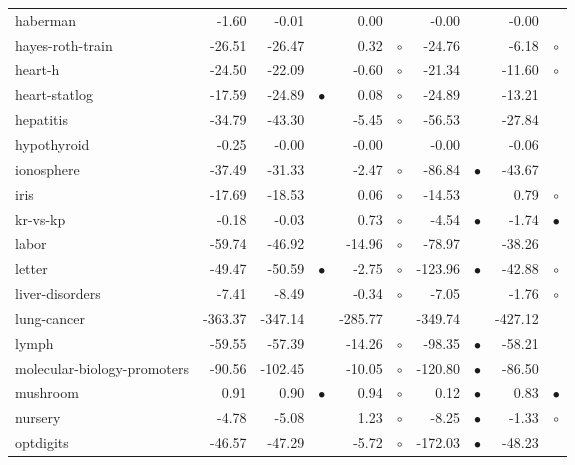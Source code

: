 \begin{table}[thb]
{\begin{tabular}{lrr@{\hspace{0.1cm}}cr@{\hspace{0.1cm}}cr@{\hspace{0.1cm}}cr@{\hspace{0.1cm}}c}
haberman &   -1.60 &   -0.01 &           &    0.00 &          &   -0.00 &           &   -0.00 &          \\
hayes-roth-train &  -26.51 &  -26.47 &           &    0.32 &  $\circ$ &  -24.76 &           &   -6.18 &   $\circ$\\
heart-h &  -24.50 &  -22.09 &           &   -0.60 &  $\circ$ &  -21.34 &           &  -11.60 &   $\circ$\\
heart-statlog &  -17.59 &  -24.89 & $\bullet$ &    0.08 &  $\circ$ &  -24.89 &           &  -13.21 &          \\
hepatitis &  -34.79 &  -43.30 &           &   -5.45 &  $\circ$ &  -56.53 &           &  -27.84 &          \\
hypothyroid &   -0.25 &   -0.00 &           &   -0.00 &          &   -0.00 &           &   -0.06 &          \\
ionosphere &  -37.49 &  -31.33 &           &   -2.47 &  $\circ$ &  -86.84 & $\bullet$ &  -43.67 &          \\
iris &  -17.69 &  -18.53 &           &    0.06 &  $\circ$ &  -14.53 &           &    0.79 &   $\circ$\\
kr-vs-kp &   -0.18 &   -0.03 &           &    0.73 &  $\circ$ &   -4.54 & $\bullet$ &   -1.74 & $\bullet$\\
labor &  -59.74 &  -46.92 &           &  -14.96 &  $\circ$ &  -78.97 &           &  -38.26 &          \\
letter &  -49.47 &  -50.59 & $\bullet$ &   -2.75 &  $\circ$ & -123.96 & $\bullet$ &  -42.88 &   $\circ$\\
liver-disorders &   -7.41 &   -8.49 &           &   -0.34 &  $\circ$ &   -7.05 &           &   -1.76 &   $\circ$\\
lung-cancer & -363.37 & -347.14 &           & -285.77 &          & -349.74 &           & -427.12 &          \\
lymph &  -59.55 &  -57.39 &           &  -14.26 &  $\circ$ &  -98.35 & $\bullet$ &  -58.21 &          \\
molecular-biology-promoters &  -90.56 & -102.45 &           &  -10.05 &  $\circ$ & -120.80 & $\bullet$ &  -86.50 &          \\
mushroom &    0.91 &    0.90 & $\bullet$ &    0.94 &  $\circ$ &    0.12 & $\bullet$ &    0.83 & $\bullet$\\
nursery &   -4.78 &   -5.08 &           &    1.23 &  $\circ$ &   -8.25 & $\bullet$ &   -1.33 &   $\circ$\\
optdigits &  -46.57 &  -47.29 &           &   -5.72 &  $\circ$ & -172.03 & $\bullet$ &  -48.23 &          \\

\end{tabular}}
\end{table}
